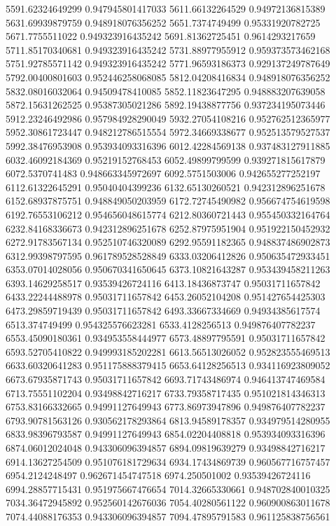 {5591.62324649299 0.947945801417033
5611.66132264529 0.94972136815389
5631.69939879759 0.948918076356252
5651.7374749499 0.95331920782725
5671.7755511022 0.949323916435242
5691.81362725451 0.9614293217659
5711.85170340681 0.949323916435242
5731.88977955912 0.959373573462168
5751.92785571142 0.949323916435242
5771.96593186373 0.929137249787649
5792.00400801603 0.952446258068085
5812.04208416834 0.948918076356252
5832.08016032064 0.94509478410085
5852.11823647295 0.948883207639058
5872.15631262525 0.95387305021286
5892.19438877756 0.937234195073446
5912.23246492986 0.957984928290049
5932.27054108216 0.952762512365977
5952.30861723447 0.948212786515554
5972.34669338677 0.952513579527537
5992.38476953908 0.953934093316396
6012.42284569138 0.937483127911885
6032.46092184369 0.95219152768453
6052.49899799599 0.939271815617879
6072.5370741483 0.948663345972697
6092.5751503006 0.942655277252197
6112.61322645291 0.95040404399236
6132.65130260521 0.942312896251678
6152.68937875751 0.948849050203959
6172.72745490982 0.956674754619598
6192.76553106212 0.954656048615774
6212.80360721443 0.955450332164764
6232.84168336673 0.942312896251678
6252.87975951904 0.951922150452932
6272.91783567134 0.952510746320089
6292.95591182365 0.948837486902873
6312.99398797595 0.961789528528849
6333.03206412826 0.950635472933451
6353.07014028056 0.950670341650645
6373.10821643287 0.953439458211263
6393.14629258517 0.93539426724116
6413.18436873747 0.95031711657842
6433.22244488978 0.95031711657842
6453.26052104208 0.951427654425303
6473.29859719439 0.95031711657842
6493.33667334669 0.94934385617574
6513.374749499 0.954325576623281
6533.4128256513 0.949876407782237
6553.45090180361 0.934953558444977
6573.48897795591 0.95031711657842
6593.52705410822 0.949993185202281
6613.56513026052 0.952823555469513
6633.60320641283 0.951175888379415
6653.64128256513 0.934116923809052
6673.67935871743 0.95031711657842
6693.71743486974 0.946413747469584
6713.75551102204 0.93498842716217
6733.79358717435 0.951021814346313
6753.83166332665 0.94991127649943
6773.86973947896 0.949876407782237
6793.90781563126 0.930562178293864
6813.94589178357 0.934979514280955
6833.98396793587 0.94991127649943
6854.02204408818 0.953934093316396
6874.06012024048 0.943306096394857
6894.09819639279 0.93498842716217
6914.13627254509 0.951076181729634
6934.17434869739 0.960567716757457
6954.2124248497 0.962671454747518
6974.250501002 0.93539426724116
6994.28857715431 0.951975667476654
7014.32665330661 0.948702840010325
7034.36472945892 0.952560142676036
7054.40280561122 0.960900863011678
7074.44088176353 0.943306096394857
7094.47895791583 0.961125838756561
}
